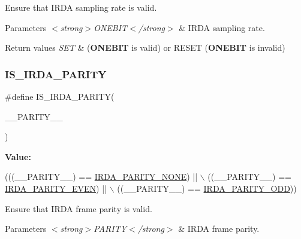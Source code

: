 Ensure that I\+R\+DA sampling rate is valid. 


\begin{DoxyParams}{Parameters}
{\em $<$strong$>$\+O\+N\+E\+B\+I\+T$<$/strong$>$} & I\+R\+DA sampling rate. \\
\hline
\end{DoxyParams}

\begin{DoxyRetVals}{Return values}
{\em S\+ET} & ({\bfseries O\+N\+E\+B\+IT} is valid) or R\+E\+S\+ET ({\bfseries O\+N\+E\+B\+IT} is invalid) \\
\hline
\end{DoxyRetVals}
\mbox{\label{group___i_r_d_a___private___macros_ga21d1f4784a9e003b3195e27b22173e69}} 
\subsubsection{\texorpdfstring{I\+S\+\_\+\+I\+R\+D\+A\+\_\+\+P\+A\+R\+I\+TY}{IS\_IRDA\_PARITY}}
{\footnotesize\ttfamily \#define I\+S\+\_\+\+I\+R\+D\+A\+\_\+\+P\+A\+R\+I\+TY(\begin{DoxyParamCaption}\item[{}]{\+\_\+\+\_\+\+P\+A\+R\+I\+T\+Y\+\_\+\+\_\+ }\end{DoxyParamCaption})}

{\bfseries Value\+:}
\begin{DoxyCode}
(((\_\_PARITY\_\_) == \hyperlink{group___i_r_d_a___parity_ga930d90dc494068f6e8fd34c2008af6c3}{IRDA\_PARITY\_NONE}) || \(\backslash\)
                                    ((\_\_PARITY\_\_) == \hyperlink{group___i_r_d_a___parity_ga1fa76c44ce474adc0d277d849217cc95}{IRDA\_PARITY\_EVEN}) || \(\backslash\)
                                    ((\_\_PARITY\_\_) == \hyperlink{group___i_r_d_a___parity_ga64282fa5873f188bb26429bbc88bf040}{IRDA\_PARITY\_ODD}))
\end{DoxyCode}


Ensure that I\+R\+DA frame parity is valid. 


\begin{DoxyParams}{Parameters}
{\em $<$strong$>$\+P\+A\+R\+I\+T\+Y$<$/strong$>$} & I\+R\+DA frame parity. \\
\hline
\end{DoxyParams}

